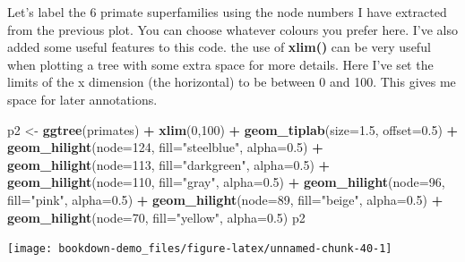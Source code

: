 \documentclass[
]{book}
\newenvironment{Shaded}{\begin{snugshade}}{\end{snugshade}}
\newcommand{\DataTypeTok}[1]{\textcolor[rgb]{0.13,0.29,0.53}{#1}}
\newcommand{\DecValTok}[1]{\textcolor[rgb]{0.00,0.00,0.81}{#1}}
\newcommand{\FloatTok}[1]{\textcolor[rgb]{0.00,0.00,0.81}{#1}}
\newcommand{\KeywordTok}[1]{\textcolor[rgb]{0.13,0.29,0.53}{\textbf{#1}}}
\newcommand{\NormalTok}[1]{#1}
\newcommand{\OperatorTok}[1]{\textcolor[rgb]{0.81,0.36,0.00}{\textbf{#1}}}
\newcommand{\StringTok}[1]{\textcolor[rgb]{0.31,0.60,0.02}{#1}}
\begin{document}
Let's label the 6 primate superfamilies using the node numbers I have extracted from the previous plot. You can choose whatever colours you prefer here. I've also added some useful features to this code. the use of \textbf{xlim()} can be very useful when plotting a tree with some extra space for more details. Here I've set the limits of the x dimension (the horizontal) to be between 0 and 100. This gives me space for later annotations.

\begin{Shaded}
\begin{Highlighting}[]
\NormalTok{p2 \textless{}{-}}\StringTok{ }\KeywordTok{ggtree}\NormalTok{(primates) }\OperatorTok{+}
\StringTok{  }\KeywordTok{xlim}\NormalTok{(}\DecValTok{0}\NormalTok{,}\DecValTok{100}\NormalTok{) }\OperatorTok{+}
\StringTok{  }\KeywordTok{geom\_tiplab}\NormalTok{(}\DataTypeTok{size=}\FloatTok{1.5}\NormalTok{, }\DataTypeTok{offset=}\FloatTok{0.5}\NormalTok{) }\OperatorTok{+}
\StringTok{  }\KeywordTok{geom\_hilight}\NormalTok{(}\DataTypeTok{node=}\DecValTok{124}\NormalTok{, }\DataTypeTok{fill=}\StringTok{"steelblue"}\NormalTok{, }\DataTypeTok{alpha=}\FloatTok{0.5}\NormalTok{) }\OperatorTok{+}
\StringTok{  }\KeywordTok{geom\_hilight}\NormalTok{(}\DataTypeTok{node=}\DecValTok{113}\NormalTok{, }\DataTypeTok{fill=}\StringTok{"darkgreen"}\NormalTok{, }\DataTypeTok{alpha=}\FloatTok{0.5}\NormalTok{) }\OperatorTok{+}
\StringTok{  }\KeywordTok{geom\_hilight}\NormalTok{(}\DataTypeTok{node=}\DecValTok{110}\NormalTok{, }\DataTypeTok{fill=}\StringTok{"gray"}\NormalTok{, }\DataTypeTok{alpha=}\FloatTok{0.5}\NormalTok{) }\OperatorTok{+}
\StringTok{  }\KeywordTok{geom\_hilight}\NormalTok{(}\DataTypeTok{node=}\DecValTok{96}\NormalTok{, }\DataTypeTok{fill=}\StringTok{"pink"}\NormalTok{, }\DataTypeTok{alpha=}\FloatTok{0.5}\NormalTok{) }\OperatorTok{+}
\StringTok{  }\KeywordTok{geom\_hilight}\NormalTok{(}\DataTypeTok{node=}\DecValTok{89}\NormalTok{, }\DataTypeTok{fill=}\StringTok{"beige"}\NormalTok{, }\DataTypeTok{alpha=}\FloatTok{0.5}\NormalTok{) }\OperatorTok{+}
\StringTok{  }\KeywordTok{geom\_hilight}\NormalTok{(}\DataTypeTok{node=}\DecValTok{70}\NormalTok{, }\DataTypeTok{fill=}\StringTok{"yellow"}\NormalTok{, }\DataTypeTok{alpha=}\FloatTok{0.5}\NormalTok{) }
\NormalTok{p2}
\end{Highlighting}
\end{Shaded}

\begin{center}\texttt{[image: bookdown-demo\_files/figure-latex/unnamed-chunk-40-1]} \end{center}
\end{document}
